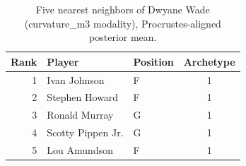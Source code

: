 \begin{table}[htbp]
  \centering\small
  \begin{tabular}{rllc}
    \toprule
    Rank & Player & Position & Archetype \\
    \midrule
    1 & Ivan Johnson & F & 1 \\
    2 & Stephen Howard & F & 1 \\
    3 & Ronald Murray & G & 1 \\
    4 & Scotty Pippen Jr. & G & 1 \\
    5 & Lou Amundson & F & 1 \\
    \bottomrule
  \end{tabular}
  \caption{Five nearest neighbors of Dwyane Wade (curvature_m3 modality), Procrustes-aligned posterior mean.}
  \label{tab:Dwyane_Wade_neighbors_curvature_m3}
\end{table}

